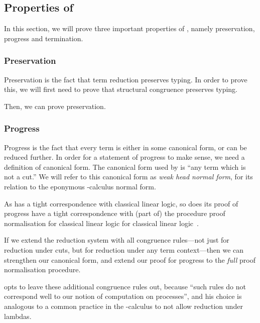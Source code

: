 \subsection{Properties of \rcp}\label{sec:cp-properties}
In this section, we will prove three important properties of \rcp, namely
preservation, progress and termination.

\subsubsection{Preservation}
Preservation is the fact that term reduction preserves typing. In order to prove
this, we will first need to prove that structural congruence preserves typing.


Then, we can prove preservation.




\subsubsection{Progress}
Progress is the fact that every term is either in some canonical form, or can be
reduced further. In order for a statement of progress to make sense, we need a
definition of canonical form. The canonical form used by \cp is ``any term which
is not a cut.'' We will refer to this canonical form as \emph{weak head normal
form}, for its relation to the eponymous \textlambda-calculus normal form. 

As \cp has a tight correspondence with classical linear logic, so does its proof
of progress have a tight correspondence with (part of) the procedure proof
normalisation for classical linear logic for classical linear
logic~\cite{girard1987}.

If we extend the reduction system with all congruence rules---not just
\cpRedGammaCut for reduction under cuts, but for reduction under any term
context---then we can strengthen our canonical form, and extend our proof for
progress to the \emph{full} proof normalisation procedure.


 opts to leave these additional congruence rules out,
because ``such rules do not correspond well to our notion of computation on
processes'', and his choice is analogous to a common practice in the
\textlambda-calculus to not allow reduction under lambdas.


